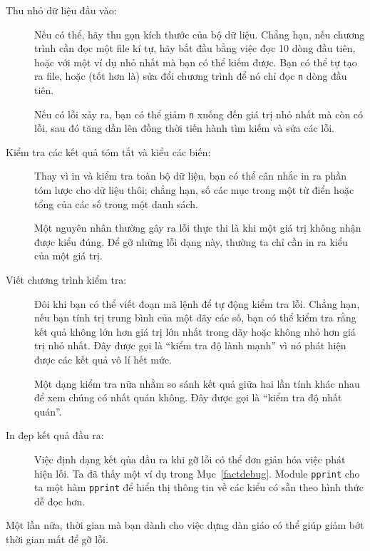 \documentclass[11pt]{book}
\begin{document}
\begin{description}

\item[Thu nhỏ dữ liệu đầu vào:] Nếu có thể, hãy thu gọn kích thước
của bộ dữ liệu. Chẳng hạn, nếu chương trình cần đọc một file kí tự,
hãy bắt đầu bằng việc đọc 10 dòng đầu tiên, hoặc với một ví dụ
nhỏ nhất mà bạn có thể kiếm được. Bạn có thể tự tạo ra file, hoặc
(tốt hơn là) sửa đổi chương trình  để nó chỉ đọc {\tt n} dòng đầu tiên.

Nếu có lỗi xảy ra, bạn có thể giảm {\tt n} xuống đến giá trị nhỏ nhất
mà còn có lỗi, sau đó tăng dần lên đồng thời tiến hành tìm kiếm và
sửa các lỗi.

\item[Kiểm tra các kết quả tóm tắt và kiểu các biến:] 
Thay vì in và kiểm tra toàn bộ dữ liệu, bạn có thể cân nhắc in ra 
phần tóm lược cho dữ liệu thôi; chẳng hạn, số các mục trong một từ điển
hoặc tổng của các số trong một danh sách.

Một nguyên nhân thường gây ra lỗi thực thi là khi một giá trị không
nhận được kiểu đúng. Để gỡ những lỗi dạng này, thường ta chỉ cần in ra
kiểu của một giá trị.

\item[Viết chương trình kiểm tra:] Đôi khi bạn có thể viết đoạn mã lệnh
để tự động kiểm tra lỗi. Chẳng hạn, nếu bạn tính trị trung bình của một  
dãy các số, bạn có thể kiểm tra rằng kết quả không lớn hơn giá trị lớn nhất
trong dãy hoặc không nhỏ hơn giá trị nhỏ nhất. Đây được gọi là ``kiểm
tra độ lành mạnh'' vì nó phát hiện được các kết quả vô lí hết mức.


Một dạng kiểm tra nữa nhằm so sánh kết quả giữa hai lần tính khác nhau
để xem chúng có nhất quán không. Đây được gọi là ``kiểm tra độ nhất quán''.

\item[In đẹp kết quả đầu ra:] Việc định dạng kết qủa đầu ra khi gỡ lỗi
có thể đơn giản hóa việc phát hiện lỗi. Ta đã thấy một ví dụ trong 
Mục~\ref{factdebug}.  Module {\tt pprint} cho ta một hàm
{\tt pprint} để hiển thị thông tin về các kiểu có sẵn theo hình thức
dễ đọc hơn.


\end{description}

Một lần nữa, thời gian mà bạn dành cho việc dựng dàn giáo có thể giúp
giảm bớt thời gian mất để gỡ lỗi.
\end{document}
